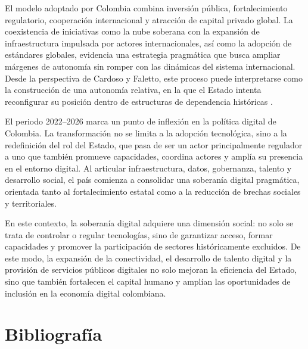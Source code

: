 \documentclass[9pt,letterpaper,twocolumn,twoside,apabib]{rho-class/rho}
\begin{document}
El modelo adoptado por Colombia combina inversión pública, fortalecimiento regulatorio, cooperación internacional y atracción de capital privado global. La coexistencia de iniciativas como la nube soberana con la expansión de infraestructura impulsada por actores internacionales, así como la adopción de estándares globales, evidencia una estrategia pragmática que busca ampliar márgenes de autonomía sin romper con las dinámicas del sistema internacional. Desde la perspectiva de Cardoso y Faletto, este proceso puede interpretarse como la construcción de una autonomía relativa, en la que el Estado intenta reconfigurar su posición dentro de estructuras de dependencia históricas \parencite{cardoso_faletto_dependencia_1977}.

El periodo 2022--2026 marca un punto de inflexión en la política digital de Colombia. La transformación no se limita a la adopción tecnológica, sino a la redefinición del rol del Estado, que pasa de ser un actor principalmente regulador a uno que también promueve capacidades, coordina actores y amplía su presencia en el entorno digital. Al articular infraestructura, datos, gobernanza, talento y desarrollo social, el país comienza a consolidar una soberanía digital pragmática, orientada tanto al fortalecimiento estatal como a la reducción de brechas sociales y territoriales.

En este contexto, la soberanía digital adquiere una dimensión social: no solo se trata de controlar o regular tecnologías, sino de garantizar acceso, formar capacidades y promover la participación de sectores históricamente excluidos. De este modo, la expansión de la conectividad, el desarrollo de talento digital y la provisión de servicios públicos digitales no solo mejoran la eficiencia del Estado, sino que también fortalecen el capital humano y amplían las oportunidades de inclusión en la economía digital colombiana.


% 

\section{Bibliografía}
\printbibliography[heading=none]



\clearpage
\onecolumn
\end{document}
